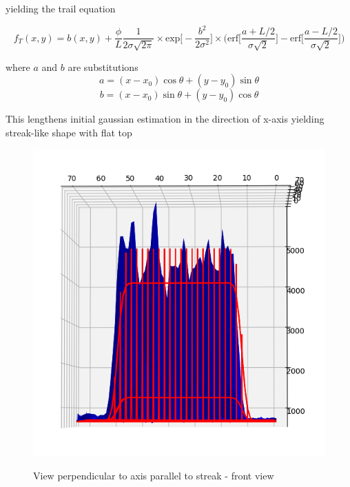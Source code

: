 \documentclass[12pt, a4paper, oneside]{book}
\begin{document}
yielding the trail equation

$$ f_T(x,y)=b(x,y)+\frac{\phi}{L}\frac{1}{2\sigma \sqrt{2\pi}} \times \text{exp} \bigg[ - \frac{b^2}{2\sigma^2} \bigg] \times \bigg( \text{erf} \bigg[ \frac{a+L/2}{\sigma\sqrt{2}}\bigg] - \text{erf} \bigg[ \frac{a-L/2}{\sigma\sqrt{2}} \bigg] \bigg) $$

where $a$ and $b$ are substitutions
$$ a = (x-x_0)\cos{\theta}+(y-y_0)\sin{\theta} $$
$$ b = (x-x_0)\sin{\theta} + (y-y_0)\cos{\theta} $$

This lengthens initial gaussian estimation in the direction of x-axis yielding streak-like shape with flat top

\begin{figure}[H]
    \begin{center}
        \includegraphics[scale=2.00]{images/veres_front.png}
        \label{img:veres_front}
        \caption{View perpendicular to axis parallel to streak - front view}
    \end{center}
\end{figure}
\end{document}
